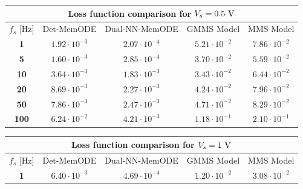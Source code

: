 \documentclass[11pt, oneside]{article}
\begin{document}
\begin{table}
    \centering
    \begin{tabular}{c|cccc}
        \toprule
        \multicolumn{5}{c}{\textbf{Loss function comparison for \(V_s = 0.5 \rm \ V\)}}                                                                                  \\
        \midrule
        \(f_s\) [Hz]   & Det-MemODE           & Dual-NN-MemODE                                   & GMMS Model           & MMS Model                                      \\
        \midrule
        \textbf{1}   & \(1.92 \cdot 10^{-3}\) & \color{ieeegreen} \bfseries \(2.07 \cdot 10^{-4}\) & \(5.21 \cdot 10^{-2}\) & \color{ieeered} \bfseries \(7.86 \cdot 10^{-2}\) \\
        \textbf{5}   & \(1.60 \cdot 10^{-3}\) & \color{ieeegreen} \bfseries \(2.85 \cdot 10^{-4}\) & \(3.70 \cdot 10^{-2}\) & \color{ieeered} \bfseries \(5.59 \cdot 10^{-2}\) \\
        \textbf{10}  & \(3.64 \cdot 10^{-3}\) & \color{ieeegreen} \bfseries \(1.83 \cdot 10^{-3}\) & \(3.43 \cdot 10^{-2}\) & \color{ieeered} \bfseries \(6.44 \cdot 10^{-2}\) \\
        \textbf{20}  & \(8.69 \cdot 10^{-3}\) & \color{ieeegreen} \bfseries \(2.27 \cdot 10^{-3}\) & \(4.24 \cdot 10^{-2}\) & \color{ieeered} \bfseries \(7.96 \cdot 10^{-2}\) \\
        \textbf{50}  & \(7.86 \cdot 10^{-3}\) & \color{ieeegreen} \bfseries \(2.47 \cdot 10^{-3}\) & \(4.71 \cdot 10^{-2}\) & \color{ieeered} \bfseries \(8.29 \cdot 10^{-2}\) \\
        \textbf{100} & \(6.24 \cdot 10^{-2}\) & \color{ieeegreen} \bfseries \(4.21 \cdot 10^{-3}\) & \(1.18 \cdot 10^{-1}\) & \color{ieeered} \bfseries \(2.10 \cdot 10^{-1}\) \\
        \bottomrule
    \end{tabular}
    \begin{tabular}{c|cccc}
        \toprule
        \multicolumn{5}{c}{\textbf{Loss function comparison for \(V_s = 1 \rm \ V\)}}                                                                                    \\
        \midrule
        \(f_s\) [Hz]   & Det-MemODE           & Dual-NN-MemODE                                   & GMMS Model           & MMS Model                                      \\
        \midrule
        \textbf{1}   & \(6.40 \cdot 10^{-3}\) & \color{ieeegreen} \bfseries \(4.69 \cdot 10^{-4}\) & \(1.20 \cdot 10^{-2}\) & \color{ieeered} \bfseries \(3.08 \cdot 10^{-2}\) \\

\end{tabular}
\end{table}
\end{document}
